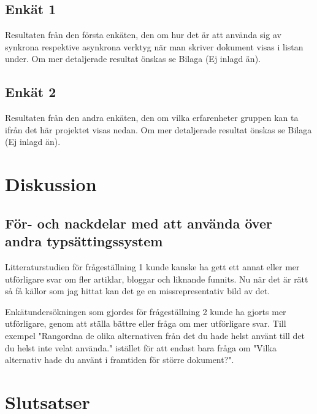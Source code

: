 \subsection{Enkät 1}
Resultaten från den första enkäten, den om hur det är att använda sig av synkrona respektive asynkrona verktyg när man skriver dokument visas i listan under. Om mer detaljerade resultat önskas se Bilaga (Ej inlagd än).

\subsection{Enkät 2}
Resultaten från den andra enkäten, den om vilka erfarenheter gruppen kan ta ifrån det här projektet visas nedan. Om mer detaljerade resultat önskas se Bilaga (Ej inlagd än).

\section{Diskussion}
\label{sec:discussion-tuhkala}

\subsection{För- och nackdelar med att använda \latex över andra typsättingssystem}



Litteraturstudien för frågeställning 1 kunde kanske ha gett ett annat eller mer utförligare svar om fler artiklar, bloggar och liknande funnits. Nu när det är rätt så få källor som jag hittat kan det ge en missrepresentativ bild av det.

Enkätundersökningen som gjordes för frågeställning 2 kunde ha gjorts mer utförligare, genom att ställa bättre eller fråga om mer utförligare svar. Till exempel "Rangordna de olika alternativen från det du hade helst använt till det du helst inte velat använda." istället för att endast bara fråga om "Vilka alternativ hade du använt i framtiden för större dokument?".

\section{Slutsatser}
\label{sec:conclusions-tuhkala}


